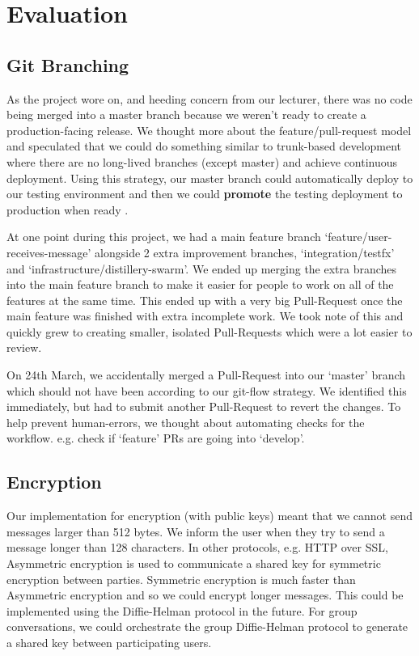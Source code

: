 \documentclass[11pt,a4paper]{report}
\begin{document}
\chapter{Evaluation}

\section{Git Branching}
As the project wore on, and heeding concern from our lecturer, there was no code being merged into a master branch because we weren't ready to create a production-facing release. We thought more about the feature/pull-request model and speculated that we could do something similar to trunk-based development where there are no long-lived branches (except master) and achieve continuous deployment. Using this strategy, our master branch could automatically deploy to our testing environment and then we could \textbf{promote} the testing deployment to production when ready \cite{website:thoughtworks_trunk_based_development}.

At one point during this project, we had a main feature branch `feature/user-receives-message' alongside 2 extra improvement branches, `integration/testfx' and `infrastructure/distillery-swarm'. We ended up merging the extra branches into the main feature branch to make it easier for people to work on all of the features at the same time. This ended up with a very big Pull-Request once the main feature was finished with extra incomplete work. We took note of this and quickly grew to creating smaller, isolated Pull-Requests which were a lot easier to review.

On 24th March, we accidentally merged a Pull-Request into our `master' branch which should not have been according to our git-flow strategy. We identified this immediately, but had to submit another Pull-Request to revert the changes. To help prevent human-errors, we thought about automating checks for the workflow. e.g. check if `feature' PRs are going into `develop'.

\section{Encryption}
Our implementation for encryption (with public keys) meant that we cannot send messages larger than 512 bytes. We inform the user when they try to send a message longer than 128 characters. In other protocols, e.g. HTTP over SSL, Asymmetric encryption is used to communicate a shared key for symmetric encryption between parties. Symmetric encryption is much faster than Asymmetric encryption and so we could encrypt longer messages. This could be implemented using the Diffie-Helman protocol in the future. For group conversations, we could orchestrate the group Diffie-Helman protocol to generate a shared key between participating users.
\end{document}
